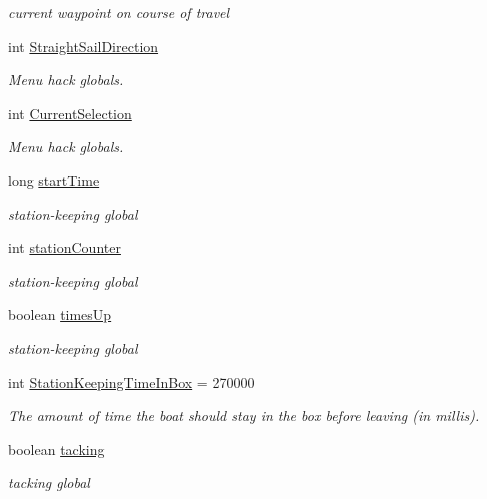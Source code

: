 \begin{DoxyCompactItemize}
\begin{DoxyCompactList}\small\item\em current waypoint on course of travel \end{DoxyCompactList}\item 
int \hyperlink{group__group1_gac9d865c1411ae815f6b2394c45d604e7}{\-Straight\-Sail\-Direction}
\begin{DoxyCompactList}\small\item\em \-Menu hack globals. \end{DoxyCompactList}\item 
int \hyperlink{group__group1_ga79863a7d6b31d0c89c5050c2cd931cfe}{\-Current\-Selection}
\begin{DoxyCompactList}\small\item\em \-Menu hack globals. \end{DoxyCompactList}\item 
long \hyperlink{group__group1_ga8ad49a66e91d8658c5f1f7dbcbcbbd2f}{start\-Time}
\begin{DoxyCompactList}\small\item\em station-\/keeping global \end{DoxyCompactList}\item 
int \hyperlink{group__group1_gaffc96d075c8796c3d5ef3dc5824c0819}{station\-Counter}
\begin{DoxyCompactList}\small\item\em station-\/keeping global \end{DoxyCompactList}\item 
boolean \hyperlink{group__group1_gaf453f5fa6c0df67707ca308a2fc80ca1}{times\-Up}
\begin{DoxyCompactList}\small\item\em station-\/keeping global \end{DoxyCompactList}\item 
int \hyperlink{group__group1_gabe157ddfb46568e2de8b041f54ac6d98}{\-Station\-Keeping\-Time\-In\-Box} = 270000
\begin{DoxyCompactList}\small\item\em \-The amount of time the boat should stay in the box before leaving (in millis). \end{DoxyCompactList}\item 
boolean \hyperlink{group__group1_gab23a7a79ede8d141fa92f4475d36fb24}{tacking}
\begin{DoxyCompactList}\small\item\em tacking global \end{DoxyCompactList}\item 

\end{DoxyCompactItemize}
